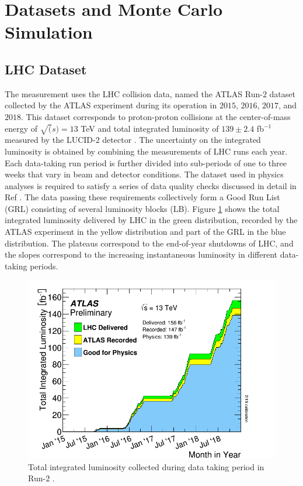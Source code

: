 \section{Datasets and Monte Carlo Simulation}
\label{sec:DataSetAndMonteCarlo}

\subsection{LHC Dataset}
\label{subsec:Dataset}

The measurement uses the LHC collision data, named the ATLAS Run-$2$ dataset collected by the ATLAS experiment during its operation in $2015$, $2016$, $2017$, and $2018$. This dataset corresponds to proton-proton collisions at the center-of-mass energy of $\sqrt(s) = 13$ TeV and total integrated luminosity of $139 \pm 2.4$ fb$^{-1}$ measured by the LUCID-2 detector \cite{ATLASLuminosityDetector}\cite{ATLASRun2IntegratedLumi}. The uncertainty on the integrated luminosity is obtained by combining the measurements of LHC runs each year. Each data-taking run period is further divided into sub-periods of one to three weeks that vary in beam and detector conditions. The dataset used in physics analyses is required to satisfy a series of data quality checks discussed in detail in Ref \cite{ATLASRun2DataTaking}. The data passing these requirements collectively form a Good Run List (GRL) consisting of several luminosity blocks (LB). Figure \ref{fig:InstLuminosity} shows the total integrated luminosity delivered by LHC in the green distribution, recorded by the ATLAS experiment in the yellow distribution and part of the GRL in the blue distribution. The plateaus correspond to the end-of-year shutdowns of LHC, and the slopes correspond to the increasing instantaneous luminosity in different data-taking periods. 

\begin{figure}
\centering
\includegraphics[width=.8\linewidth]{figures/AnalysisOverview/IntegratedLumiRun2.pdf}  
  \caption{Total integrated luminosity collected during data taking period in Run-$2$ \cite{ATLASRun2DataTaking}. }
\label{fig:InstLuminosity}
\end{figure}

